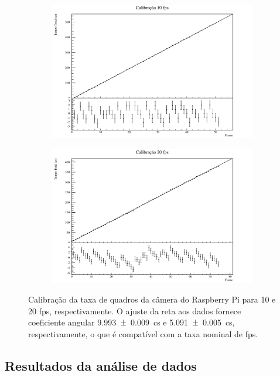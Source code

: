 \documentclass[twoside, twocolumn]{article}
\begin{document}
\begin{figure}[h]
	\centering
    \begin{subfigure}[b]{0.8\linewidth}
    	\includegraphics[width = \linewidth]{fps10}
    \end{subfigure}
        \begin{subfigure}[b]{0.8\linewidth}
    	\includegraphics[width = \linewidth]{fps20}
    \end{subfigure}
    \caption{Calibração da taxa de quadros da câmera do Raspberry Pi para 10 e 20 fps, respectivamente. O ajuste da reta aos dados fornece coeficiente angular \SI{9.993(9)}{\centi\second} e \SI{5.091(5)}{\centi\second}, respectivamente, o que é compatível com a taxa nominal de fps.}
    \label{fig:fps}
\end{figure}

\subsection{Resultados da análise de dados}
\end{document}
